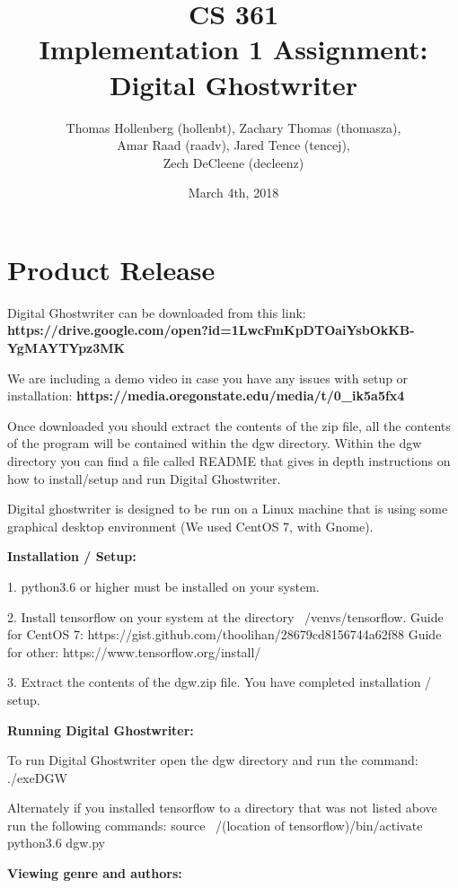 \documentclass[12pt]{article}
\title{CS 361 \\ Implementation 1 Assignment: \\ Digital Ghostwriter}
\author{Thomas Hollenberg (hollenbt), Zachary Thomas (thomasza),\\ Amar Raad (raadv), Jared Tence (tencej), \\  Zech DeCleene (decleenz)}
\date{March 4th, 2018}
\begin{document}
\maketitle
\newpage
\tableofcontents

\newpage

\section{Product Release}

Digital Ghostwriter can be downloaded from this link:\newline
\textbf{https://drive.google.com/open?id=1LwcFmKpDTOaiYsbOkKB-YgMAYTYpz3MK}

We are including a demo video in case you have any issues with setup or installation:\newline
\textbf{https://media.oregonstate.edu/media/t/0\_ik5a5fx4}

Once downloaded you should extract the contents of the zip file, all the contents of the program will be contained within the dgw directory.
Within the dgw directory you can find a file called README that gives in depth instructions on how to install/setup and run Digital Ghostwriter. 

Digital ghostwriter is designed to be run on a Linux machine that is using some graphical desktop environment (We used CentOS 7, with Gnome).

\textbf{Installation / Setup:}

1. python3.6 or higher must be installed on your system.

2. Install tensorflow on your system at the directory ~/venvs/tensorflow.
Guide for CentOS 7: https://gist.github.com/thoolihan/28679cd8156744a62f88
Guide for other: https://www.tensorflow.org/install/

3. Extract the contents of the dgw.zip file. You have completed installation / setup.

\textbf{Running Digital Ghostwriter:}

To run Digital Ghostwriter open the dgw directory and run the command: ./exeDGW

Alternately if you installed tensorflow to a directory that was not listed above run the following commands: \newline
source ~/(location of tensorflow)/bin/activate \newline
python3.6 dgw.py

\newpage
\textbf{Viewing genre and authors:}
\end{document}
